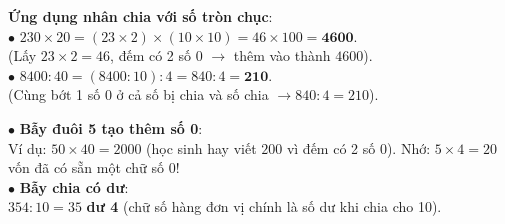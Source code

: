 \documentclass[14pt,a4paper,oneside]{extbook}
\begin{document}
\noindent
\begin{minipage}[t]{0.53\textwidth}
  \begin{tcolorbox}[
    enhanced,
    title={\footnotesize\bfseries\color{white}\faCheckCircle\ Ví dụ thực hành chuẩn mực},
    colback=green!2!white,
    colframe=green!60!black,
    arc=2.5mm, boxrule=0.8pt, top=1.8mm, bottom=1.8mm, left=2.2mm, right=2.2mm
  ]
    \footnotesize
    \textbf{Ứng dụng nhân chia với số tròn chục}:\\
    $\bullet$ $230 \times 20 = (23 \times 2) \times (10 \times 10) = 46 \times 100 = \mathbf{4600}$.\\
    (Lấy $23 \times 2 = 46$, đếm có 2 số 0 $\rightarrow$ thêm vào thành $4600$).\\
    $\bullet$ $8400 : 40 = (8400 : 10) : 4 = 840 : 4 = \mathbf{210}$.\\
    (Cùng bớt 1 số 0 ở cả số bị chia và số chia $\rightarrow 840 : 4 = 210$).
  \end{tcolorbox}
\end{minipage}%
\hfill
\begin{minipage}[t]{0.45\textwidth}
  \begin{tcolorbox}[
    enhanced,
    title={\footnotesize\bfseries\color{white}\faExclamationTriangle\ Mẹo tránh bẫy trắc nghiệm},
    colback=red!2!white,
    colframe=red!70!black,
    arc=2.5mm, boxrule=0.8pt, top=1.8mm, bottom=1.8mm, left=2.2mm, right=2.2mm
  ]
    \footnotesize
    $\bullet$ \textbf{Bẫy đuôi 5 tạo thêm số 0}:\\
    Ví dụ: $50 \times 40 = 2000$ (học sinh hay viết $200$ vì đếm có 2 số 0). Nhớ: $5 \times 4 = 20$ vốn đã có sẵn một chữ số 0!\\
    $\bullet$ \textbf{Bẫy chia có dư}:\\
    $354 : 10 = 35$ \textbf{dư 4} (chữ số hàng đơn vị chính là số dư khi chia cho 10).
  \end{tcolorbox}
\end{minipage}
\end{document}
